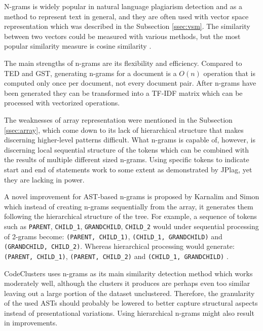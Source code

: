 N-grams is widely popular in natural language plagiarism detection and as a method to represent text in general, and they are often used with vector space representation which was described in the Subsection \ref{ssec:vsm}. The similarity between two vectors could be measured with various methods, but the most popular similarity measure is cosine similarity \cite{ir-in-practise, chaiyong-2018}.

The main strengths of n-grams are its flexibility and efficiency. Compared to TED and GST, generating n-grams for a document is a $O(n)$ operation that is computed only once per document, not every document pair. After n-grams have been generated they can be transformed into a TF-IDF matrix which can be processed with vectorized operations.

The weaknesses of array representation were mentioned in the Subsection \ref{ssec:array}, which come down to its lack of hierarchical structure that makes discerning higher-level patterns difficult. What n-grams is capable of, however, is discerning local sequential structure of the tokens which can be combined with the results of multiple different sized n-grams. Using specific tokens to indicate start and end of statements work to some extent as demonstrated by JPlag, yet they are lacking in power.

A novel improvement for AST-based n-grams is proposed by Karnalim and Simon which instead of creating n-grams sequentially from the array, it generates them following the hierarchical structure of the tree. For example, a sequence of tokens such as \texttt{PARENT}, \texttt{CHILD\_1}, \texttt{GRANDCHILD}, \texttt{CHILD\_2} would under sequential processing of 2-grams become: \texttt{(PARENT, CHILD\_1)}, \texttt{(CHILD\_1, GRANDCHILD)} and \texttt{(GRANDCHILD, CHILD\_2)}. Whereas hierarchical processing would generate: \texttt{(PARENT, CHILD\_1)}, \texttt{(PARENT, CHILD\_2)} and \texttt{(CHILD\_1, GRANDCHILD)} \cite{simon-better-ngrams-2020}.

CodeClusters uses n-grams as its main similarity detection method which works moderately well, although the clusters it produces are perhaps even too similar leaving out a large portion of the dataset unclustered. Therefore, the granularity of the used ASTs should probably be lowered to better capture structural aspects instead of presentational variations. Using hierarchical n-grams might also result in improvements.
